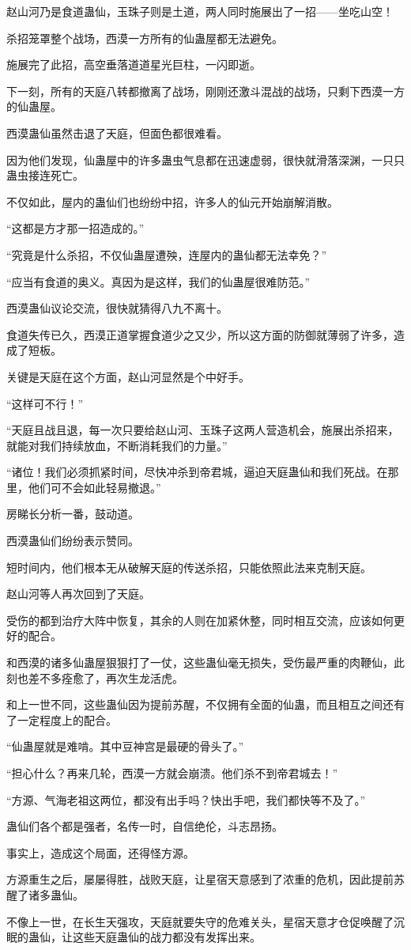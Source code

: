 \begin{this_body}
赵山河乃是食道蛊仙，玉珠子则是土道，两人同时施展出了一招——坐吃山空！

杀招笼罩整个战场，西漠一方所有的仙蛊屋都无法避免。

施展完了此招，高空垂落道道星光巨柱，一闪即逝。

下一刻，所有的天庭八转都撤离了战场，刚刚还激斗混战的战场，只剩下西漠一方的仙蛊屋。

西漠蛊仙虽然击退了天庭，但面色都很难看。

因为他们发现，仙蛊屋中的许多蛊虫气息都在迅速虚弱，很快就滑落深渊，一只只蛊虫接连死亡。

不仅如此，屋内的蛊仙们也纷纷中招，许多人的仙元开始崩解消散。

“这都是方才那一招造成的。”

“究竟是什么杀招，不仅仙蛊屋遭殃，连屋内的蛊仙都无法幸免？”

“应当有食道的奥义。真因为是这样，我们的仙蛊屋很难防范。”

西漠蛊仙议论交流，很快就猜得八九不离十。

食道失传已久，西漠正道掌握食道少之又少，所以这方面的防御就薄弱了许多，造成了短板。

关键是天庭在这个方面，赵山河显然是个中好手。

“这样可不行！”

“天庭且战且退，每一次只要给赵山河、玉珠子这两人营造机会，施展出杀招来，就能对我们持续放血，不断消耗我们的力量。”

“诸位！我们必须抓紧时间，尽快冲杀到帝君城，逼迫天庭蛊仙和我们死战。在那里，他们可不会如此轻易撤退。”

房睇长分析一番，鼓动道。

西漠蛊仙们纷纷表示赞同。

短时间内，他们根本无从破解天庭的传送杀招，只能依照此法来克制天庭。

赵山河等人再次回到了天庭。

受伤的都到治疗大阵中恢复，其余的人则在加紧休整，同时相互交流，应该如何更好的配合。

和西漠的诸多仙蛊屋狠狠打了一仗，这些蛊仙毫无损失，受伤最严重的肉鞭仙，此刻也差不多痊愈了，再次生龙活虎。

和上一世不同，这些蛊仙因为提前苏醒，不仅拥有全面的仙蛊，而且相互之间还有了一定程度上的配合。

“仙蛊屋就是难啃。其中豆神宫是最硬的骨头了。”

“担心什么？再来几轮，西漠一方就会崩溃。他们杀不到帝君城去！”

“方源、气海老祖这两位，都没有出手吗？快出手吧，我们都快等不及了。”

蛊仙们各个都是强者，名传一时，自信绝伦，斗志昂扬。

事实上，造成这个局面，还得怪方源。

方源重生之后，屡屡得胜，战败天庭，让星宿天意感到了浓重的危机，因此提前苏醒了诸多蛊仙。

不像上一世，在长生天强攻，天庭就要失守的危难关头，星宿天意才仓促唤醒了沉眠的蛊仙，让这些天庭蛊仙的战力都没有发挥出来。

\end{this_body}

